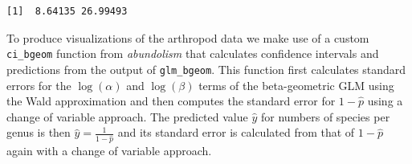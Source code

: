 \documentclass[
  letterpaper,
  DIV=11,
  numbers=noendperiod]{scrartcl}
\begin{document}
\begin{verbatim}
[1]  8.64135 26.99493
\end{verbatim}

To produce visualizations of the arthropod data we make use of a custom
\texttt{ci\_bgeom} function from \emph{abundolism} that calculates
confidence intervals and predictions from the output of
\texttt{glm\_bgeom}. This function first calculates standard errors for
the \(\log(\alpha)\) and \(\log(\beta)\) terms of the beta-geometric GLM
using the Wald approximation and then computes the standard error for
\(1 - \hat{p}\) using a change of variable approach. The predicted value
\(\hat{y}\) for numbers of species per genus is then
\(\hat{y} = \frac{1}{1 - \hat{p}}\) and its standard error is calculated
from that of \(1 - \hat{p}\) again with a change of variable approach.
\end{document}
